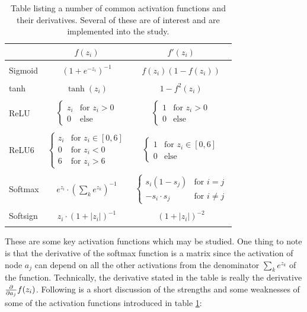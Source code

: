 	        \begin{table}[H]
	            \centering
	            \begin{tabular}[t]{l@{\hskip 0.4in}c@{\hskip 0.3in}c}
	                \toprule
	                 & $f(z_i)$ & $f'(z_i)$ \\
	                \midrule\\
	                Sigmoid & $(1+e^{-z_i})^{-1}$ & $f(z_i)\left( 1-f(z_i) \right)$ \\\\
	                tanh & $\tanh (z_i)$ & $1-f^2(z_i)$ \\\\
	                ReLU & $\begin{cases} z_i & \text{for } z_i>0 \\ 0 & \text{else} \end{cases}$ & $\begin{cases} 1 & \text{for } z_i>0 \\ 0 & \text{else} \end{cases}$ \\\\
	                ReLU6 & $\begin{cases} z_i & \text{for } z_i\in[0,6] \\ 0 & \text{for } z_i<0 \\ 6 & \text{for } z_i>6 \end{cases}$ & $\begin{cases} 1 & \text{for } z_i\in [0,6] \\ 0 & \text{else} \end{cases}$ \\\\
	                Softmax & $e^{z_i}\cdot(\sum_k e^{z_k})^{-1}$ & $\begin{cases}s_i(1-s_j) & \text{for } i=j\\ -s_i\cdot s_j & \text{for } i\neq j \end{cases}$ \\\\
	                Softsign & $z_i\cdot \left( 1+|z_i| \right)^{-1}$ & $\left( 1+|z_i| \right)^{-2}$\\\\
	                \bottomrule
	            \end{tabular}
	            \caption{Table listing a number of common activation functions and their derivatives. Several of these are of interest and are implemented into the study.}
	            \label{tab:activation_functions}
	        \end{table}
	        These are some key activation functions which may be studied. One thing to note is that the derivative of the softmax function is a matrix since the activation of node $a_j$ can depend on all the other activations from the denominator $\sum_ke^{z_k}$ of the function. Technically, the derivative stated in the table is really the derivative $\pdv{}{a_j}f(z_i)$. Following is a short discussion of the strengths and some weaknesses of some of the activation functions introduced in table \ref{tab:activation_functions}:
